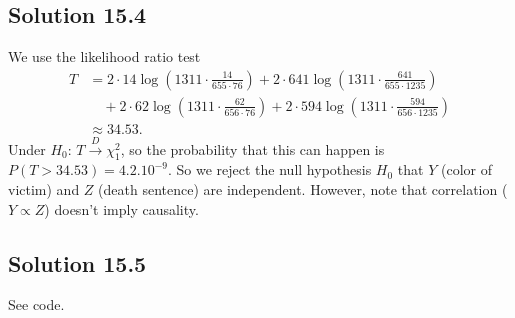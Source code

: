 \subsection*{Solution 15.4}

We use the likelihood ratio test
\begin{equation*}
    \begin{split}
        T &= 2 \cdot 14 \log\left(1311 \cdot \frac{14}{655 \cdot 76} \right)
            + 2 \cdot 641 \log\left(1311 \cdot \frac{641}{655 \cdot 1235} \right) \\
            &\quad + 2 \cdot 62 \log\left(1311 \cdot \frac{62}{656 \cdot 76} \right)
            + 2 \cdot 594 \log\left(1311 \cdot \frac{594}{656 \cdot 1235} \right) \\
        &\approx 34.53.
    \end{split}
\end{equation*}
Under $H_0$: $T \xrightarrow{D} \chi^2_1$, so the probability that this can happen is $P(T > 34.53) = 4.2.10^{-9}$.
So we reject the null hypothesis $H_0$ that $Y$ (color of victim) and $Z$ (death sentence) are independent.
However, note that correlation ($Y \propto Z$) doesn't imply causality.


\subsection*{Solution 15.5}

See code.
